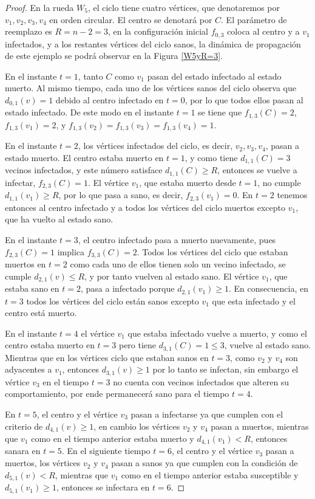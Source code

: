 \documentclass[12pt,titlepage,twoside,openright]{book}
\begin{document}
\begin{proof}
    En la rueda $W_5$, el ciclo tiene cuatro v\'ertices, que denotaremos por $v_1,v_2,v_3,v_4$ en orden circular. El centro se denotar\'a por $C$. El par\'ametro de reemplazo es $R=n-2=3$, en la configuraci\'on inicial $f_{0,3}$ coloca al centro y a $v_1$ infectados, y a los restantes v\'ertices del ciclo sanos, la din\'amica de propagaci\'on de este ejemplo se podr\'a observar en la Figura \ref{W5yR=3}. 

    En el instante $t=1$, tanto $C$ como $v_1$ pasan del estado infectado al estado muerto. Al mismo tiempo, cada uno de los v\'ertices sanos del ciclo observa que $d_{0,1}(v)=1$ debido al centro infectado en $t=0$, por lo que todos ellos pasan al estado infectado. De este modo en el instante $t=1$ se tiene que $f_{1,3}(C)=2$, $f_{1,3}(v_1)=2$, y $f_{1,3}(v_2)=f_{1,3}(v_3)=f_{1,3}(v_4)=1$.

    En el instante $t=2$, los v\'ertices infectados del ciclo, es decir, $v_2,v_3,v_4$, pasan a estado muerto. El centro estaba muerto en $t=1$, y como tiene $d_{1,1}(C)=3$ vecinos infectados, y este n\'umero satisface $d_{1,1}(C)\geq R$, entonces se vuelve a infectar, $f_{2,3}(C)=1$. El v\'ertice $v_1$, que estaba muerto desde $t=1$, no cumple $d_{1,1}(v_1)\geq R$, por lo que pasa a sano, es decir, $f_{2,3}(v_1)=0$. En $t=2$ tenemos entonces al centro infectado y a todos los v\'ertices del ciclo muertos excepto $v_1$, que ha vuelto al estado sano.

    En el instante $t=3$, el centro infectado pasa a muerto nuevamente, pues $f_{2,3}(C)=1$ implica $f_{3,3}(C)=2$. Todos los v\'ertices del ciclo que estaban muertos en $t=2$ como cada uno de ellos tienen solo un vecino infectado, se cumple $d_{2,1}(v)\leq R$, y por tanto vuelven al estado sano. El v\'ertice $v_1$, que estaba sano en $t=2$, pasa a infectado porque $d_{2,1}(v_1)\geq 1$. En consecuencia, en $t=3$ todos los v\'ertices del ciclo est\'an sanos excepto $v_1$ que esta infectado y el centro est\'a muerto.

    En el instante $t=4$ el v\'ertice $v_1$ que estaba infectado vuelve a muerto, y como el centro estaba muerto en $t=3$ pero tiene $d_{3,1}(C)=1\leq 3$, vuelve al estado sano. Mientras que en los v\'ertices ciclo que estaban sanos en $t=3$, como $v_2$ y $v_4$ son adyacentes a $v_1$, entonces $d_{3,1}(v) \geq 1$ por lo tanto se infectan, sin embargo el v\'ertice $v_3$ en el tiempo $t=3$ no cuenta con vecinos infectados que alteren su comportamiento, por ende permanecer\'a sano para el tiempo $t=4$.

    En $t=5$, el centro y el v\'ertice $v_3$ pasan a infectarse ya que cumplen con el criterio de $d_{4,1}(v)\geq 1$, en cambio los v\'ertices $v_2$ y $v_4$ pasan a muertos, mientras que $v_1$ como en el tiempo anterior estaba muerto y $d_{4,1}(v_1) < R$, entonces sanara en $t=5$. En el siguiente tiempo $t=6$, el centro y el v\'ertice $v_3$ pasan a muertos, los v\'ertices $v_2$ y $v_4$ pasan a sanos ya que cumplen con la condici\'on de $d_{5,1}(v) < R$, mientras que $v_1$ como en el tiempo anterior estaba susceptible y $d_{5,1}(v_1) \geq 1$, entonces se infectara en $t=6$.
    

\end{proof}
\end{document}
